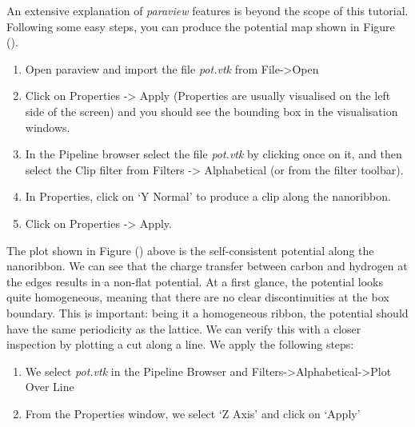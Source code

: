 \documentclass[a4paper,11pt,english]{sphinxmanual}
\begin{document}
{{An extensive explanation of \emph{paraview} features is beyond the scope of
this tutorial. Following some easy steps, you can produce the
potential map shown in Figure {\hyperref[transport:fig-clip-pot]{\emph{}}} ().
\begin{enumerate}
\item {} 
Open paraview and import the file \emph{pot.vtk} from File-\textgreater{}Open

\item {} 
Click on Properties -\textgreater{} Apply (Properties are usually visualised on the left side of the screen) and you should see the bounding box in the visualisation windows.

\item {} 
In the Pipeline browser select the file \emph{pot.vtk} by clicking once on it, and then select the Clip filter from Filters -\textgreater{} Alphabetical (or from the filter toolbar).

\item {} 
In Properties, click on `Y Normal' to produce a clip along the nanoribbon.

\item {} 
Click on Properties -\textgreater{} Apply.

\end{enumerate}

The plot shown in Figure {\hyperref[transport:fig-clip-pot]{\emph{}}} () above is the
self-consistent potential along the nanoribbon. We can see that the
charge transfer between carbon and hydrogen at the edges results in a
non-flat potential. At a first glance, the potential looks quite
homogeneous, meaning that there are no clear discontinuities at the
box boundary. This is important: being it a homogeneous ribbon, the
potential should have the same periodicity as the lattice. We can
verify this with a closer inspection by plotting a cut along a
line. We apply the following steps:
\begin{enumerate}
\item {} 
We select \emph{pot.vtk} in the Pipeline Browser and Filters-\textgreater{}Alphabetical-\textgreater{}Plot Over Line

\item {} 
From the Properties window, we select `Z Axis' and click on `Apply'

\end{enumerate}

}}
\end{document}
